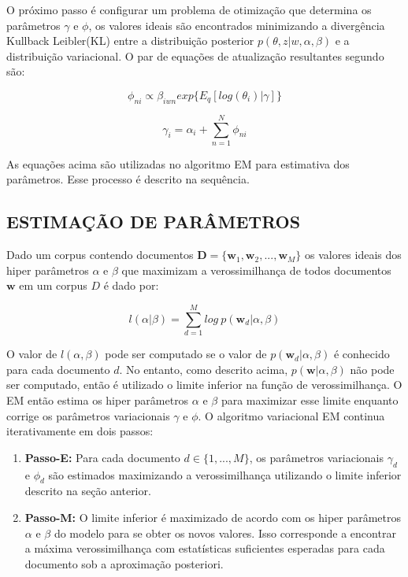 \documentclass[12pt,a4paper]{article}
\begin{document}
O próximo passo é configurar um problema de otimização que determina os parâmetros $\gamma$ e $\phi$,
 os valores ideais são encontrados minimizando a divergência Kullback Leibler(KL) entre a distribuição posterior $p(\theta, z|w,\alpha,\beta)$ e a distribuição variacional.
 O par de equações de atualização resultantes segundo  são:

\begin{equation}
\phi_{ni} \propto \beta_{iwn} exp\{E_q[log(\theta_i)|\gamma]\}
\end{equation}

\begin{equation}
\gamma_i = \alpha_i + \sum_{n=1}^{N} \phi_{ni}
\end{equation}

As equações acima são utilizadas no algoritmo EM para estimativa dos parâmetros. Esse processo é descrito na sequência.

\subsection{ESTIMAÇÃO DE PARÂMETROS}
Dado um corpus contendo documentos $\textbf{D} = \{\textbf{w}_1, \textbf{w}_2, . . ., \textbf{w}_M\}$ os valores ideais dos hiper parâmetros $\alpha$ e $\beta$
 que maximizam a verossimilhança de todos documentos $\textbf{w}$ em um corpus $D$ é dado por:

\begin{equation}
l(\alpha|\beta) = \sum_{d=1}^{M} log\ p(\textbf{w}_d|\alpha,\beta)
\end{equation}

O valor de $l(\alpha, \beta)$ pode ser computado se o valor de $p(\textbf{w}_d|\alpha, \beta)$ é conhecido para cada documento $d$. No entanto,
 como descrito acima, $p(\textbf{w}|\alpha,\beta)$ não pode ser computado, então é utilizado o limite inferior na função de verossimilhança.
 O EM então estima os hiper parâmetros $\alpha$ e $\beta$ para maximizar esse limite enquanto corrige os parâmetros variacionais $\gamma$ e $\phi$. 
 O algoritmo variacional EM continua iterativamente em dois passos:

\begin{enumerate}
\item \textbf{Passo-E:} Para cada documento $d \in \{1,. . . , M\}$, os parâmetros variacionais $\gamma_d$ e $\phi_d$ são estimados maximizando a verossimilhança utilizando o limite inferior descrito na seção anterior.
\item \textbf{Passo-M:} O limite inferior é maximizado  de acordo com os hiper parâmetros $\alpha$ e $\beta$ do modelo para se obter os novos valores. 
 Isso corresponde a encontrar a máxima verossimilhança com estatísticas suficientes esperadas para cada documento sob a aproximação posteriori.
\end{enumerate}
\end{document}
